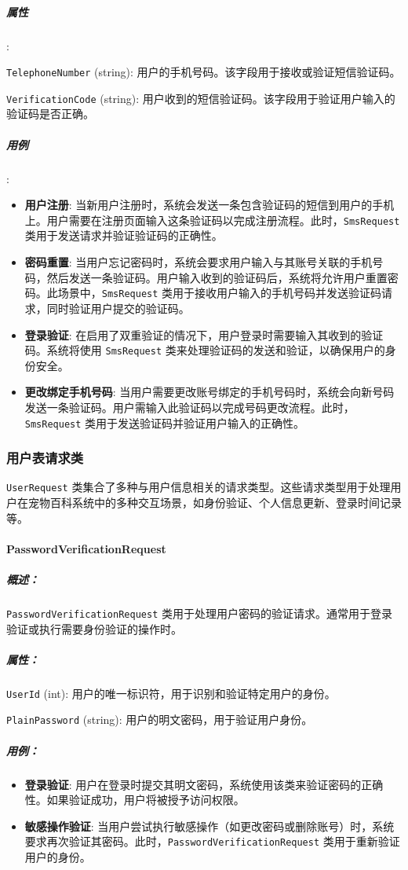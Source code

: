 \subparagraph{属性}:\

\texttt{TelephoneNumber} (string): 用户的手机号码。该字段用于接收或验证短信验证码。

\texttt{VerificationCode} (string): 用户收到的短信验证码。该字段用于验证用户输入的验证码是否正确。

\subparagraph{用例}:
\begin{itemize}
	\item \textbf{用户注册}: 当新用户注册时，系统会发送一条包含验证码的短信到用户的手机上。用户需要在注册页面输入这条验证码以完成注册流程。此时，\texttt{SmsRequest} 类用于发送请求并验证验证码的正确性。
	\item \textbf{密码重置}: 当用户忘记密码时，系统会要求用户输入与其账号关联的手机号码，然后发送一条验证码。用户输入收到的验证码后，系统将允许用户重置密码。此场景中，\texttt{SmsRequest} 类用于接收用户输入的手机号码并发送验证码请求，同时验证用户提交的验证码。
	\item \textbf{登录验证}: 在启用了双重验证的情况下，用户登录时需要输入其收到的验证码。系统将使用 \texttt{SmsRequest} 类来处理验证码的发送和验证，以确保用户的身份安全。
	\item \textbf{更改绑定手机号码}: 当用户需要更改账号绑定的手机号码时，系统会向新号码发送一条验证码。用户需输入此验证码以完成号码更改流程。此时，\texttt{SmsRequest} 类用于发送验证码并验证用户输入的正确性。
\end{itemize}

\subsubsection{用户表请求类}

\texttt{UserRequest} 类集合了多种与用户信息相关的请求类型。这些请求类型用于处理用户在宠物百科系统中的多种交互场景，如身份验证、个人信息更新、登录时间记录等。

\paragraph{PasswordVerificationRequest}
\subparagraph{概述：} \texttt{PasswordVerificationRequest} 类用于处理用户密码的验证请求。通常用于登录验证或执行需要身份验证的操作时。

\subparagraph{属性：}

\texttt{UserId} (int): 用户的唯一标识符，用于识别和验证特定用户的身份。

\texttt{PlainPassword} (string): 用户的明文密码，用于验证用户身份。


\subparagraph{用例：}
\begin{itemize}
	\item \textbf{登录验证}: 用户在登录时提交其明文密码，系统使用该类来验证密码的正确性。如果验证成功，用户将被授予访问权限。
	\item \textbf{敏感操作验证}: 当用户尝试执行敏感操作（如更改密码或删除账号）时，系统要求再次验证其密码。此时，\texttt{PasswordVerificationRequest} 类用于重新验证用户的身份。
\end{itemize}

